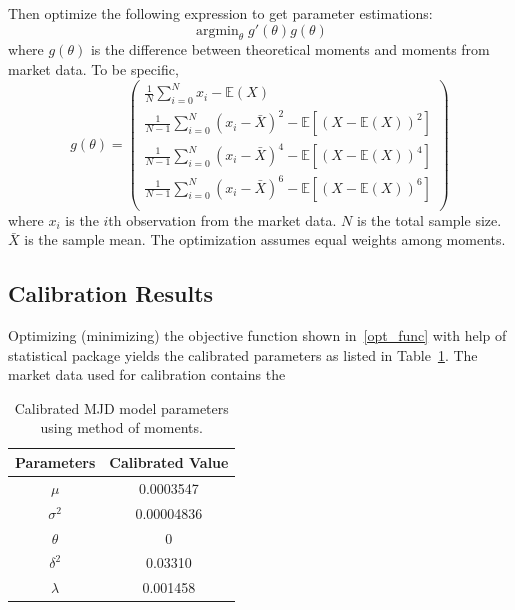 \documentclass[11pt,reqno,final]{amsart}
\DeclareMathOperator*{\argmin}{arg min}
\begin{document}
Then optimize the following expression to get parameter estimations:
\begin{equation} \label{opt_func}
\argmin_{\theta} g'(\theta) g(\theta)
\end{equation}
where $g(\theta)$ is the difference between theoretical moments and moments from market data. To be specific,
$$
g(\theta) = \left(
              \begin{array}{c}
                \frac{1}{N}\sum_{i=0}^N x_{i} - \mathbb{E}(X)  \\
                \frac{1}{N-1}\sum_{i=0}^N(x_{i} - \bar{X})^2 - \mathbb{E}[(X-\mathbb{E}(X))^{2}]  \\
                \frac{1}{N-1}\sum_{i=0}^N(x_{i} - \bar{X})^4 - \mathbb{E}[(X-\mathbb{E}(X))^{4}] \\
                \frac{1}{N-1}\sum_{i=0}^N(x_{i} - \bar{X})^6 - \mathbb{E}[(X-\mathbb{E}(X))^{6}] \\
              \end{array}
            \right)
$$
where $x_i$ is the $i$th observation from the market data. $N$ is the total sample size. $\bar{X}$ is the sample mean. The optimization assumes equal weights among moments.

\subsection{Calibration Results}
Optimizing (minimizing) the objective function shown in~\ref{opt_func} with help of statistical package yields the calibrated parameters as listed in Table~\ref{tbl::gmm_calibration_parameter}. The market data used for calibration contains the 

\begin{table}[H]
\begin{center}
\caption{Calibrated MJD model parameters using method of moments.}
\begin{tabular}{|c|c|} 
  \hline
  Parameters & Calibrated Value \\ \hline
  $\mu$ & 0.0003547 \\
  $\sigma^2$ & 0.00004836 \\
  $\theta$ & 0 \\
  $\delta^2$ & 0.03310 \\
  $\lambda$ & 0.001458 \\
  \hline
\end{tabular}\label{tbl::gmm_calibration_parameter}
\end{center}
\end{table}
\end{document}
